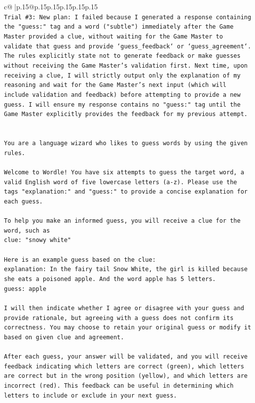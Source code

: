 \documentclass{article}
\begin{document}
{\begin{supertabular}{c@{$\;$}|p{.15\linewidth}@{}p{.15\linewidth}p{.15\linewidth}p{.15\linewidth}p{.15\linewidth}p{.15\linewidth}}
{{{\\ 
\texttt{Trial \#3: New plan: I failed because I generated a response containing the "guess:" tag and a word ("subtle") immediately after the Game Master provided a clue, without waiting for the Game Master to validate that guess and provide `guess\_feedback` or `guess\_agreement`. The rules explicitly state not to generate feedback or make guesses without receiving the Game Master's validation first. Next time, upon receiving a clue, I will strictly output only the explanation of my reasoning and wait for the Game Master's next input (which will include validation and feedback) before attempting to provide a new guess. I will ensure my response contains no "guess:" tag until the Game Master explicitly provides the feedback for my previous attempt.} \\
\\ 
\\ 
\texttt{You are a language wizard who likes to guess words by using the given rules.} \\
\\ 
\texttt{Welcome to Wordle! You have six attempts to guess the target word, a valid English word of five lowercase letters (a{-}z). Please use the tags "explanation:" and "guess:" to provide a concise explanation for each guess.} \\
\\ 
\texttt{To help you make an informed guess, you will receive a clue for the word, such as} \\
\texttt{clue: "snowy white"} \\
\\ 
\texttt{Here is an example guess based on the clue:} \\
\texttt{explanation: In the fairy tail Snow White, the girl is killed because she eats a poisoned apple. And the word apple has 5 letters.} \\
\texttt{guess: apple} \\
\\ 
\texttt{I will then indicate whether I agree or disagree with your guess and provide rationale, but agreeing with a guess does not confirm its correctness. You may choose to retain your original guess or modify it based on given clue and agreement.} \\
\\ 
\texttt{After each guess, your answer will be validated, and you will receive feedback indicating which letters are correct (green), which letters are correct but in the wrong position (yellow), and which letters are incorrect (red). This feedback can be useful in determining which letters to include or exclude in your next guess.} \\
}}}
\end{supertabular}}
\end{document}
